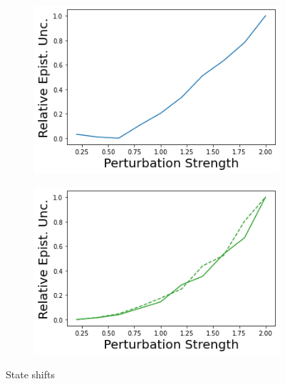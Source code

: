 \begin{figure}
\begin{subfigure}{.24\textwidth}
        \includegraphics[width=\textwidth]{sections/011_icml2022/resources/state_shift-DKL-CartPoleShift-v0-mean_epistemic_uncertainty_.png}
    \end{subfigure}
    \begin{subfigure}{.24\textwidth}
        \includegraphics[width=\textwidth]{sections/011_icml2022/resources/state_shift-PostNet-CartPoleShift-v0-mean_epistemic_uncertainty_.png}
    \end{subfigure}
        \vspace{-3mm}
    \caption*{State shifts}
    \vspace{2mm}


\end{figure}
